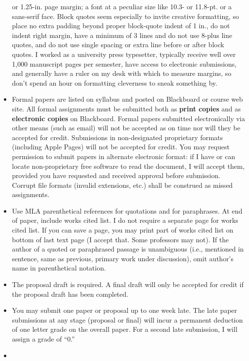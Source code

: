 \documentclass[]{article}
\begin{document}
\begin{itemize}
  or 1.25-in. page margin; a font at a peculiar size like 10.3- or
  11.8-pt. or a sans-serif face. Block quotes seem especially to invite
  creative formatting, so place no extra padding beyond proper
  block-quote indent of 1 in., do not indent right margin, have a
  minimum of 3 lines and do not use 8-plus line quotes, and do not use
  single spacing or extra line before or after block quotes. I worked as
  a university press typesetter, typically receive well over 1,000
  manuscript pages per semester, have access to electronic submissions,
  and generally have a ruler on my desk with which to measure margins,
  so don't spend an hour on formatting cleverness to sneak something by.
\item
  Formal papers are listed on syllabus and posted on Blackboard or
  course web site. All formal assignments must be submitted both as
  \textbf{print copies} and as \textbf{electronic copies} on Blackboard.
  Formal papers submitted electronically via other means (such as email)
  will not be accepted as on time nor will they be accepted for credit.
  Submissions in non-designated proprietary formats (including Apple
  Pages) will not be accepted for credit. You may request permission to
  submit papers in alternate electronic format: if I have or can locate
  non-proprietary free software to read the document, I will accept
  them, provided you have requested and received approval before
  submission. Corrupt file formats (invalid extensions, etc.) shall be
  construed as missed assignments.
\item
  Use MLA parenthetical references for quotations and for paraphrases.
  At end of paper, include works cited list. I do not require a separate
  page for works cited list. If you can save a page, you may print part
  of works cited list on bottom of last text page (I accept that. Some
  professors may not). If the author of a quoted or paraphrased passage
  is unambiguous (i.e., mentioned in sentence, same as previous, primary
  work under discussion), omit author's name in parenthetical notation.
\item
  The proposal draft is required. A final draft will only be accepted
  for credit if the proposal draft has been completed.
\item
  You may submit one paper or proposal up to one week late. The late
  paper submissions at any stage (proposal or final) will incur a
  permanent deduction of one letter grade on the overall paper. For a
  second late submission, I will assign a grade of ``0.''
\item

\end{itemize}
\end{document}
